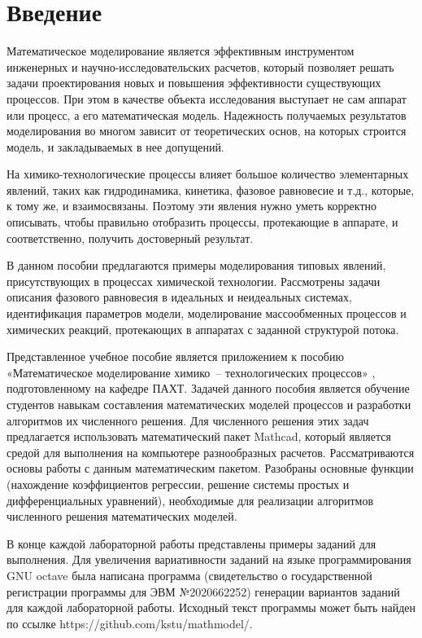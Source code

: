 \section*{Введение}
Математическое моделирование является эффективным ин\-стру\-мен\-том инженерных и научно-исследовательских расчетов, который позволяет решать задачи проектирования новых и повышения эффективности существующих процессов. При этом в качестве объекта исследования выступает не сам аппарат или процесс, а его математическая модель. Надежность получаемых результатов моделирования во многом зависит от теоретических основ, на которых строится модель, и закладываемых в нее допущений.

На химико-технологические процессы влияет большое количество элементарных явлений, таких как гидродинамика, кинетика, фазовое равновесие и т.д., которые, к тому же, и взаимосвязаны. Поэтому эти явления нужно уметь корректно описывать, чтобы правильно отобразить процессы, протекающие в аппарате, и соответственно, получить достоверный результат.

В данном пособии предлагаются примеры моделирования типовых явлений, присутствующих в процессах химической технологии. Рассмотрены задачи описания фазового равновесия в идеальных и неидеальных системах, идентификация параметров модели, моделирование массообменных процессов и химических реакций, протекающих в аппаратах с заданной структурой потока.

Представленное учебное пособие является приложением к пособию «Математическое моделирование химико~-- технологических процессов» \cite{klinov-mm2009}, подготовленному на кафедре ПАХТ. Задачей данного пособия является обучение студентов навыкам составления математических моделей процессов и разработки алгоритмов их численного решения. Для численного решения этих задач предлагается использовать математический пакет Mathcad, который является средой для выполнения на компьютере разнообразных расчетов. Рассматриваются основы работы с данным математическим пакетом. Разобраны основные функции (нахождение коэффициентов регрессии, решение системы простых и дифференциальных уравнений), необходимые для реализации алгоритмов численного решения математических моделей.

В конце каждой лабораторной работы представлены примеры заданий для выполнения. Для увеличения вариативности заданий на языке программирования GNU octave была написана программа (свидетельство о государственной регистрации программы для ЭВМ №2020662252) генерации вариантов заданий для каждой лабораторной работы. Исходный текст программы может быть найден по ссылке https://github.com/kstu/mathmodel/.